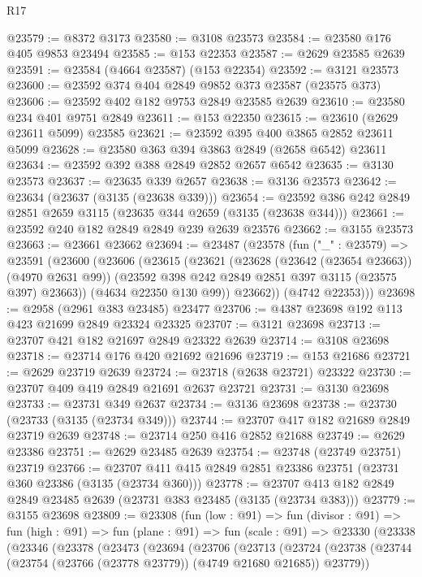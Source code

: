 \begin{lexlean}{R17}
\begin{coremodule}
@23579 := @8372 @3173
@23580 := @3108 @23573
@23584 := @23580 @176 @405 @9853 @23494
@23585 := @153 @22353
@23587 := @2629 @23585 @2639
@23591 := @23584 (@4664 @23587) (@153 @22354)
@23592 := @3121 @23573
@23600 := @23592 @374 @404 @2849 @9852 @373 @23587 (@23575 @373)
@23606 := @23592 @402 @182 @9753 @2849 @23585 @2639
@23610 := @23580 @234 @401 @9751 @2849
@23611 := @153 @22350
@23615 := @23610 (@2629 @23611 @5099) @23585
@23621 := @23592 @395 @400 @3865 @2852 @23611 @5099
@23628 := @23580 @363 @394 @3863 @2849 (@2658 @6542) @23611
@23634 := @23592 @392 @388 @2849 @2852 @2657 @6542
@23635 := @3130 @23573
@23637 := @23635 @339 @2657
@23638 := @3136 @23573
@23642 := @23634 (@23637 (@3135 (@23638 @339)))
@23654 := @23592 @386 @242 @2849 @2851 @2659 @3115 (@23635 @344 @2659 (@3135 (@23638 @344)))
@23661 := @23592 @240 @182 @2849 @2849 @239 @2639 @23576
@23662 := @3155 @23573
@23663 := @23661 @23662
@23694 := @23487
    (@23578
      (fun ("_" : @23579) =>
      @23591
        (@23600
          (@23606
            (@23615
              (@23621
                (@23628 (@23642 (@23654 @23663)) (@4970 @2631 @99))
                (@23592 @398 @242 @2849 @2851 @397 @3115 (@23575 @397) @23663))
              (@4634 @22350 @130 @99))
            @23662))
        (@4742 @22353)))
@23698 := @2958 (@2961 @383 @23485) @23477
@23706 := @4387 @23698 @192 @113 @423 @21699 @2849 @23324 @23325
@23707 := @3121 @23698
@23713 := @23707 @421 @182 @21697 @2849 @23322 @2639
@23714 := @3108 @23698
@23718 := @23714 @176 @420 @21692 @21696
@23719 := @153 @21686
@23721 := @2629 @23719 @2639
@23724 := @23718 (@2638 @23721) @23322
@23730 := @23707 @409 @419 @2849 @21691 @2637 @23721
@23731 := @3130 @23698
@23733 := @23731 @349 @2637
@23734 := @3136 @23698
@23738 := @23730 (@23733 (@3135 (@23734 @349)))
@23744 := @23707 @417 @182 @21689 @2849 @23719 @2639
@23748 := @23714 @250 @416 @2852 @21688
@23749 := @2629 @23386
@23751 := @2629 @23485 @2639
@23754 := @23748 (@23749 @23751) @23719
@23766 := @23707 @411 @415 @2849 @2851 @23386 @23751 (@23731 @360 @23386 (@3135 (@23734 @360)))
@23778 := @23707 @413 @182 @2849 @2849 @23485 @2639 (@23731 @383 @23485 (@3135 (@23734 @383)))
@23779 := @3155 @23698
@23809 := @23308
    (fun (low : @91) =>
    fun (divisor : @91) =>
    fun (high : @91) =>
    fun (plane : @91) =>
    fun (scale : @91) =>
    @23330
      (@23338
        (@23346
          (@23378
            (@23473
              (@23694
                (@23706
                  (@23713
                    (@23724
                      (@23738
                        (@23744 (@23754 (@23766 (@23778 @23779)) (@4749 @21680 @21685)) @23779))

\end{coremodule}
\end{lexlean}
